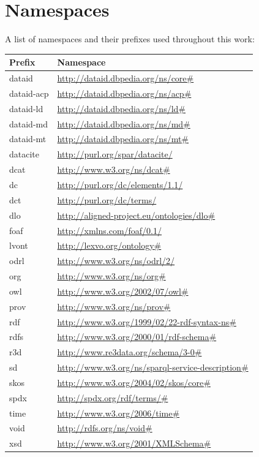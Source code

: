 \documentclass[a4paper,english,twoside,BCOR1.5cm,headsepline,DIV12,appendixprefix,final,12pt]{scrbook}
\begin{document}
\newpage
\thispagestyle{empty}

\section*{Namespaces}
A list of namespaces and their prefixes used throughout this work:
\begin{center}
\begin{tabular}{ |l|l| } 
 \hline
Prefix & Namespace\\
 \hline
dataid & \url{ http://dataid.dbpedia.org/ns/core#}\\
dataid-acp & \url{ http://dataid.dbpedia.org/ns/acp#}\\
dataid-ld & \url{ http://dataid.dbpedia.org/ns/ld#}\\
dataid-md & \url{ http://dataid.dbpedia.org/ns/md#}\\
dataid-mt & \url{ http://dataid.dbpedia.org/ns/mt#}\\
datacite & \url{ http://purl.org/spar/datacite/}\\
dcat & \url{ http://www.w3.org/ns/dcat#}\\
dc & \url{ http://purl.org/dc/elements/1.1/}\\
dct & \url{ http://purl.org/dc/terms/}\\
dlo & \url{ http://aligned-project.eu/ontologies/dlo#}\\
foaf & \url{ http://xmlns.com/foaf/0.1/}\\
lvont & \url{ http://lexvo.org/ontology#}\\
odrl & \url{ http://www.w3.org/ns/odrl/2/}\\
org & \url{ http://www.w3.org/ns/org#}\\
owl & \url{ http://www.w3.org/2002/07/owl#}\\
prov & \url{ http://www.w3.org/ns/prov#}\\
rdf & \url{ http://www.w3.org/1999/02/22-rdf-syntax-ns#}\\
rdfs & \url{ http://www.w3.org/2000/01/rdf-schema#}\\
r3d & \url{http://www.re3data.org/schema/3-0#}\\
sd & \url{ http://www.w3.org/ns/sparql-service-description#}\\
skos & \url{ http://www.w3.org/2004/02/skos/core#}\\
spdx & \url{ http://spdx.org/rdf/terms/#}\\
time & \url{ http://www.w3.org/2006/time#}\\
void & \url{ http://rdfs.org/ns/void#}\\
xsd & \url{ http://www.w3.org/2001/XMLSchema#}\\
 \hline
\end{tabular}
\end{center}
\end{document}

